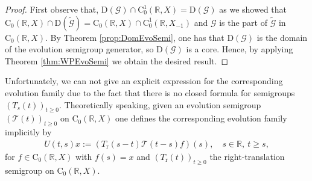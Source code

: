 \documentclass[a4paper,oneside,10pt]{amsart}
\theoremstyle{definition}
\numberwithin{equation}{section}
\def\dom{\mathrm{D}}
\def\RR{\mathbb{R}}
\begin{document}
\begin{proof}
First observe that, $\dom(\mathcal{G})\cap\mathrm{C}_0^1(\RR,X)=\dom(\mathcal{G})$ as we showed that $\mathrm{C}_0(\RR,X)\cap \dom(\widetilde{\mathcal{G}}) =\mathrm{C}_0(\RR,X)\cap\mathrm{C}^1_0(\RR,X_{-1})$ and $\mathcal{G}$ is the part of $\widetilde{\mathcal{G}}$ in $\mathrm{C}_0(\RR,X)$.
By Theorem \ref{prop:DomEvoSemi}, one has that $\dom(\mathcal{G})$ is the domain of the evolution semigroup generator, so $\dom(\mathcal{G})$ is a core.  Hence, by applying Theorem \ref{thm:WPEvoSemi} we obtain the desired result.
\end{proof}

Unfortunately, we can not give an explicit expression for the corresponding evolution family due to the fact that there is no closed formula for semigroups $(T_s(t))_{t\geq0}$. Theoretically speaking, given an evolution semigroup $(\mathcal{T}(t))_{t\geq0}$ on $\mathrm{C}_0(\RR,X)$ one defines the corresponding evolution family implicitly by
\begin{align}\label{eqn:EvoFamBySemi}
U(t,s)x:=(T_{\mathrm{r}}(s-t)\mathcal{T}(t-s)f)(s),\quad s\in\RR,\ t\geq s,
\end{align}
for $f\in\mathrm{C}_0(\RR,X)$ with $f(s) = x$ and $(T_\mathrm{r}(t))_{t\geq0}$ the right-translation semigroup on $\mathrm{C}_0(\RR,X)$.
\end{document}
